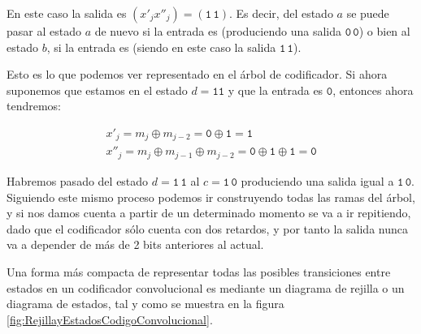 \documentclass[es,apuntes]{uah}
\begin{document}
{En este caso la salida es $(x'_j x''_j) = (\mathtt{1\, 1})$. Es decir, del estado $a$ se puede pasar al estado $a$ de nuevo si la entrada es  (produciendo una salida $\mathtt{0 \, 0}$) o bien al estado $b$, si la entrada es  (siendo en este caso la salida $\mathtt{1 \, 1}$).

Esto es lo que podemos ver representado en el árbol de codificador. Si ahora suponemos que estamos en el estado $d = \mathtt{11}$ y que la entrada es $\mathtt{0}$, entonces ahora tendremos:

\begin{displaymath}
\begin{array}{l}
	x'_j = m_j \oplus m_{j-2} = \mathtt{0} \oplus \mathtt{1} = \mathtt{1}\\
	x''_j = m_j \oplus m_{j-1} \oplus m_{j-2} = \mathtt{0} \oplus \mathtt{1} \oplus \mathtt{1} = \mathtt{0}
\end{array}
\end{displaymath}


Habremos pasado del estado $d=\mathtt{1\, 1}$ al $c=\mathtt{1\, 0}$ produciendo una salida igual a $\mathtt{1 \, 0}$. Siguiendo este mismo proceso podemos ir construyendo todas las ramas del árbol, y si nos damos cuenta a partir de un determinado momento se va a ir repitiendo, dado que el codificador sólo cuenta con dos retardos, y por tanto la salida nunca va a depender de más de 2 bits anteriores al actual.


Una forma más compacta de representar todas las posibles transiciones entre estados en un codificador convolucional es mediante un diagrama de rejilla o un diagrama de estados, tal y como se muestra en la figura \ref{fig:RejillayEstadosCodigoConvolucional}. 


}
\end{document}
